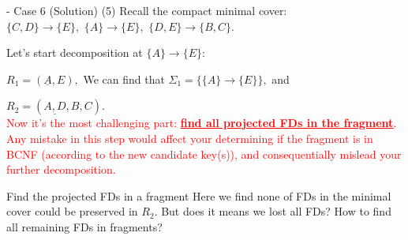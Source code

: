 \begin{frame}[fragile]{ - Case 6 (Solution)}
	(5) Recall the compact minimal cover:\\
	
	$\{C,D\} \rightarrow \{E\},$
	$\{A\}  \rightarrow \{E\},$
	$\{D,E\} \rightarrow \{B,C\}.$\\\vspace{2pt}
	
	Let's start decomposition at $\{A\} \rightarrow \{E\}$:\\\vspace{2pt}
		
	$R_1 = (\underline{A}, E),$
	We can find that 
	$\Sigma_1 = \{\{A\}\rightarrow\{E\}\},$ and\\\vspace{2pt}
	
	$R_2 = (\underline{A,D}, B, C).$ \\
	{\scriptsize\textcolor{red}{Now it's the most challenging part: \textbf{\underline{find all projected FDs in the fragment}}. Any mistake in this step would affect your determining if the fragment is in BCNF (according to the new candidate key(s)), and consequentially mislead your further decomposition.}}\\
	
	\begin{alertblock}{Find the projected FDs in a fragment}
	Here we find none of FDs in the minimal cover could be preserved in $R_2$. But does it means we lost all FDs? How to find all remaining FDs in fragments?\\
	\end{alertblock}

\end{frame}

